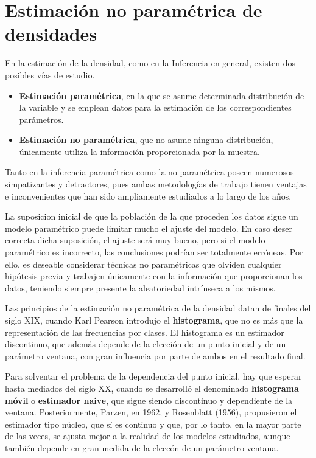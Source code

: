 \chapter{Estimación no paramétrica de densidades}

En la estimación de la densidad, como en la Inferencia en general, existen dos posibles vías de estudio.
\begin{itemize}
    \item \textbf{Estimación paramétrica}, en la que se asume determinada distribución de la variable y se emplean datos para la estimación de los correspondientes parámetros.
    \item \textbf{Estimación no paramétrica}, que no asume ninguna distribución, únicamente utiliza la información proporcionada por la muestra.
\end{itemize}
Tanto en la inferencia paramétrica como la no paramétrica poseen numerosos simpatizantes y detractores, pues ambas metodologías de trabajo tienen ventajas e inconvenientes que han sido ampliamente estudiados a lo largo de los años.

La suposicion inicial de que la población de la que proceden los datos sigue un modelo paramétrico puede limitar mucho el ajuste del modelo. En caso deser correcta dicha suposición, el ajuste será muy bueno, pero si el modelo paramétrico es incorrecto, las conclusiones podrían ser totalmente erróneas. Por ello, es deseable considerar técnicas no paramétricas que olviden cualquier hipótesis previa y trabajen únicamente con la información que proporcionan los datos, teniendo siempre presente la aleatoriedad intrínseca a los mismos.

Las principios de la estimación no paramétrica de la densidad datan de finales del siglo XIX, cuando Karl Pearson introdujo el \textbf{histograma}, que no es más que la representación de las frecuencias por clases. El histograma es un estimador discontinuo, que además depende de la elección de un punto inicial y de un parámetro ventana, con gran influencia por parte de ambos en el resultado final.

Para solventar el problema de la dependencia del punto inicial, hay que esperar hasta mediados del siglo XX, cuando se desarrolló el denominado\textbf{ histograma móvil} o \textbf{estimador naive}, que sigue siendo discontinuo y dependiente de la ventana. Posteriormente, Parzen, en 1962, y Rosenblatt (1956), propusieron el estimador tipo núcleo, que sí es continuo y que, por lo tanto, en la mayor parte de las veces, se ajusta mejor a la realidad de los modelos estudiados, aunque también depende en gran medida de la eleccón de un parámetro ventana.

